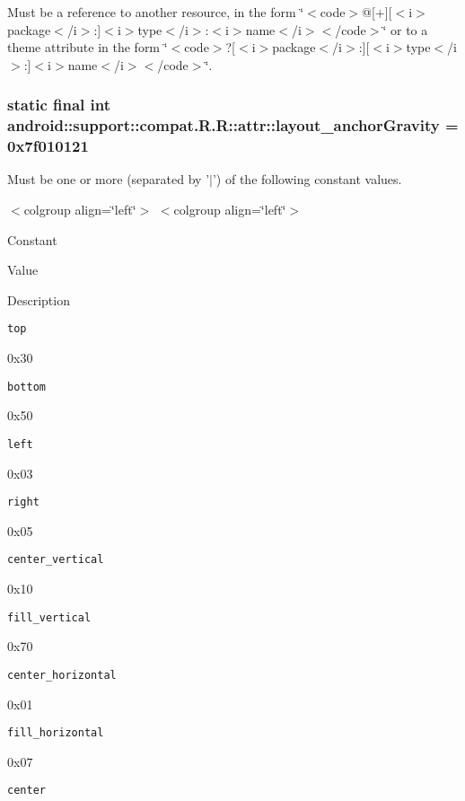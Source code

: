Must be a reference to another resource, in the form \char`\"{}$<$code$>$@\mbox{[}+\mbox{]}\mbox{[}$<$i$>$package$<$/i$>$:\mbox{]}$<$i$>$type$<$/i$>$:$<$i$>$name$<$/i$>$$<$/code$>$\char`\"{} or to a theme attribute in the form \char`\"{}$<$code$>$?\mbox{[}$<$i$>$package$<$/i$>$:\mbox{]}\mbox{[}$<$i$>$type$<$/i$>$:\mbox{]}$<$i$>$name$<$/i$>$$<$/code$>$\char`\"{}. \hypertarget{classandroid_1_1support_1_1compat_1_1_r_1_1attr_d9d68d8c0a7608eb30306722631bd185}{
\subsubsection[{layout\_\-anchorGravity}]{\setlength{\rightskip}{0pt plus 5cm}static final int android::support::compat.R.R::attr::layout\_\-anchorGravity = 0x7f010121}}
\label{classandroid_1_1support_1_1compat_1_1_r_1_1attr_d9d68d8c0a7608eb30306722631bd185}


Must be one or more (separated by '$|$') of the following constant values. \begin{TabularC}{0}
\hline
\end{TabularC}
$<$colgroup align=\char`\"{}left\char`\"{}$>$ $<$colgroup align=\char`\"{}left\char`\"{}$>$ 

Constant

Value

Description 

{\tt top}

0x30

{\tt bottom}

0x50

{\tt left}

0x03

{\tt right}

0x05

{\tt center\_\-vertical}

0x10

{\tt fill\_\-vertical}

0x70

{\tt center\_\-horizontal}

0x01

{\tt fill\_\-horizontal}

0x07

{\tt center}


